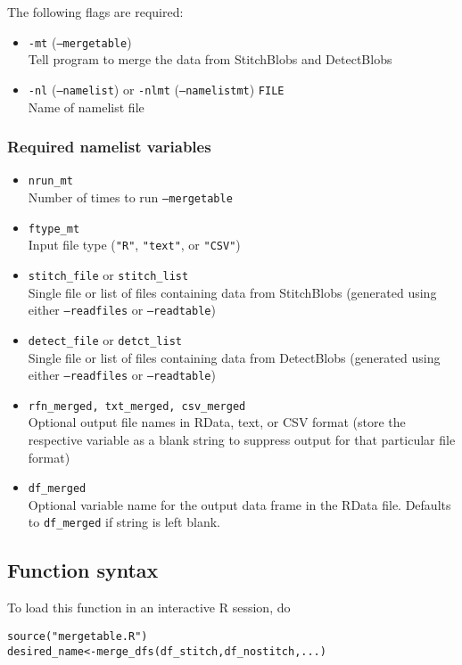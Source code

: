 \documentclass{article}
\begin{document}
The following flags are required:
\begin{itemize}
\item[] \texttt{-mt} (\texttt{--mergetable}) \\ Tell program to merge the data from StitchBlobs and DetectBlobs
\item[]\texttt{-nl} (\texttt{--namelist}) or \texttt{-nlmt} (\texttt{--namelistmt}) \texttt{FILE}\\ Name of namelist file
\end{itemize}

\subsubsection{Required namelist variables}

\begin{itemize}
\item[]\texttt{nrun\_mt}\\ Number of times to run \texttt{--mergetable}
\item[] \texttt{ftype\_mt}\\ Input file type (\texttt{"R"}, \texttt{"text"}, or \texttt{"CSV"})
\item[] \texttt{stitch\_file} or \texttt{stitch\_list}\\ Single file or list of files containing  data from StitchBlobs (generated using either \texttt{--readfiles} or \texttt{--readtable})
\item[] \texttt{detect\_file} or \texttt{detct\_list}\\ Single file or list of files containing  data from DetectBlobs (generated using either \texttt{--readfiles} or \texttt{--readtable})
\item[] \texttt{rfn\_merged, txt\_merged, csv\_merged}\\Optional output file names in RData, text, or CSV format (store the respective variable as a blank string to suppress output for that particular file format)
\item[] \texttt{df\_merged}\\Optional variable name for the output data frame in the RData file. Defaults to \texttt{df\_merged} if string is left blank.
\end{itemize}
\subsection{Function syntax}


To load this function in an interactive R session, do
\begin{verbatim}
source("mergetable.R")
desired_name<-merge_dfs(df_stitch,df_nostitch,...)
\end{verbatim}
\end{document}

